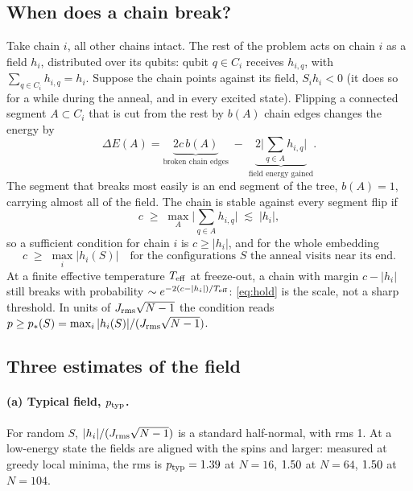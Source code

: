 \documentclass[11pt,a4paper]{article}
\begin{document}
\subsection{When does a chain break?}
Take chain $i$, all other chains intact. The rest of the problem acts on chain $i$ as a field $h_i$, distributed over its qubits: qubit $q\in C_i$ receives $h_{i,q}$, with $\sum_{q\in C_i}h_{i,q}=h_i$. Suppose the chain points against its field, $S_i h_i<0$ (it does so for a while during the anneal, and in every excited state). Flipping a connected segment $A\subset C_i$ that is cut from the rest by $b(A)$ chain edges changes the energy by
\begin{equation}
\Delta E(A)=\underbrace{2c\,b(A)}_{\text{broken chain edges}}\;-\;\underbrace{2\Big|\sum_{q\in A}h_{i,q}\Big|}_{\text{field energy gained}} .
\end{equation}
The segment that breaks most easily is an end segment of the tree, $b(A)=1$, carrying almost all of the field. The chain is stable against every segment flip if
\begin{equation}
c\;\ge\;\max_A\Big|\sum_{q\in A}h_{i,q}\Big|\;\lesssim\;|h_i| ,
\end{equation}
so a sufficient condition for chain $i$ is $c\ge|h_i|$, and for the whole embedding
\begin{equation}
\boxed{\,c\;\ge\;\max_i|h_i(S)|\quad\text{for the configurations }S\text{ the anneal visits near its end.}\,}
\label{eq:hold}
\end{equation}
At a finite effective temperature $T_{\rm eff}$ at freeze-out, a chain with margin $c-|h_i|$ still breaks with probability $\sim e^{-2(c-|h_i|)/T_{\rm eff}}$: \eqref{eq:hold} is the scale, not a sharp threshold. In units of $J_{\rm rms}\sqrt{N-1}$ the condition reads $p\ge p_\ast(S)=\max_i|h_i(S)|/(J_{\rm rms}\sqrt{N-1})$.

\subsection{Three estimates of the field}
\paragraph{(a) Typical field, $p_{\rm typ}$.} For random $S$, $|h_i|/(J_{\rm rms}\sqrt{N-1})$ is a standard half-normal, with rms 1. At a low-energy state the fields are aligned with the spins and larger: measured at greedy local minima, the rms is $p_{\rm typ}=1.39$ at $N=16$, $1.50$ at $N=64$, $1.50$ at $N=104$.
\end{document}
